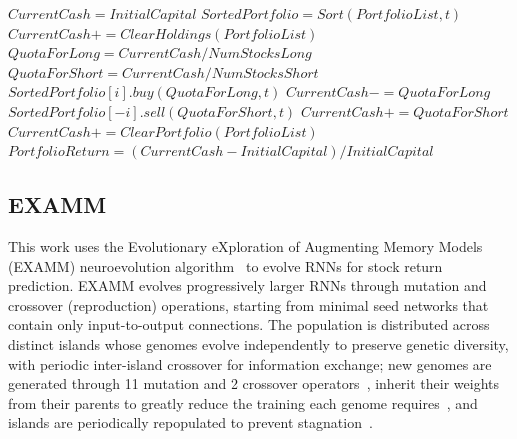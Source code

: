 \begin{algorithm*}[!t]
    \caption{Daily Long--Short Strategy}
    \label{alg:long-short}
    \begin{algorithmic}[1]
        \footnotesize
            \State $CurrentCash = InitialCapital$
                \State $SortedPortfolio = Sort(PortfolioList, t)$ 
                 
                    \State $CurrentCash += ClearHoldings(PortfolioList)$ 
                    \State $QuotaForLong = CurrentCash/NumStocksLong$
                    \State $QuotaForShort = CurrentCash/NumStocksShort$ 
                     
                        \State $SortedPortfolio[i].buy(QuotaForLong, t)$
                        \State $CurrentCash -= QuotaForLong$
                    \EndFor
                     
                        \State $SortedPortfolio[-i].sell(QuotaForShort, t)$
                        \State $CurrentCash += QuotaForShort$
                    \EndFor
                \EndIf
            \EndFor
            \State $CurrentCash += ClearPortfolio(PortfolioList)$ 
            \State $PortfolioReturn = (CurrentCash - InitialCapital)/InitialCapital$ 
        \EndFunction
    \end{algorithmic}
\end{algorithm*}




\subsection{EXAMM}
\label{subsec:examm}

This work uses the Evolutionary eXploration of Augmenting Memory Models (EXAMM) neuroevolution algorithm~\cite{ororbia2019examm} to evolve RNNs for stock return prediction. EXAMM evolves progressively larger RNNs through mutation and crossover (reproduction) operations, starting from minimal seed networks that contain only input-to-output connections. The population is distributed across distinct islands whose genomes evolve independently to preserve genetic diversity, with periodic inter-island crossover for information exchange; new genomes are generated through 11 mutation and 2 crossover operators~\cite{ororbia2019examm}, inherit their weights from their parents to greatly reduce the training each genome requires~\cite{lyu2021experimental}, and islands are periodically repopulated to prevent stagnation~\cite{lyu2021improving}.

